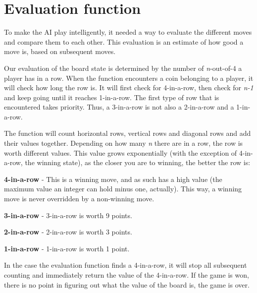 \section{Evaluation function}

To make the AI play intelligently, it needed a way to evaluate the different moves and compare them to each other. This evaluation is an estimate of how good a move is, based on subsequent moves. 

Our evaluation of the board state is determined by the number of \textit{n}-out-of-4 a player has in a row. When the function encounters a coin belonging to a player, it will check how long the row is. It will first check for 4-in-a-row, then check for \textit{n-1} and keep going until it reaches 1-in-a-row. The first type of row that is encountered takes priority. Thus, a 3-in-a-row is not also a 2-in-a-row and a 1-in-a-row.

The function will count horizontal rows, vertical rows and diagonal rows and add their values together. Depending on how many \textit{n} there are in a row, the row is worth different values. This value grows exponentially (with the exception of 4-in-a-row, the winning state), as the closer you are to winning, the better the row is:

\begin{my_itemize}

	\item \textbf{4-in-a-row} - This is a winning move, and as such has a high value (the maximum value an integer can hold minus one, actually). This way, a winning move is never overridden by a non-winning move.

	\item \textbf{3-in-a-row} - 3-in-a-row is worth 9 points.

	\item \textbf{2-in-a-row} - 2-in-a-row is worth 3 points.

	\item \textbf{1-in-a-row} - 1-in-a-row is worth 1 point.

\end{my_itemize}

In the case the evaluation function finds a 4-in-a-row, it will stop all subsequent counting and immediately return the value of the 4-in-a-row. If the game is won, there is no point in figuring out what the value of the board is, the game is over.